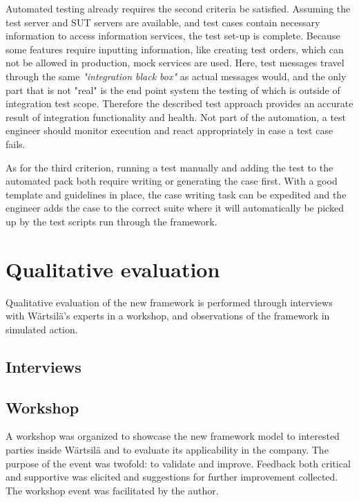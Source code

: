 \documentclass[12pt,a4paper,oneside,pdftex]{report}
\begin{document}
{{Automated testing already requires the second criteria be satisfied. Assuming the test server and SUT servers are available, and test cases contain necessary information to access information services, the test set-up is complete. Because some features require inputting information, like creating test orders, which can not be allowed in production, mock services are used. Here, test messages travel through the same \emph{"integration black box"} as actual messages would, and the only part that is not "real" is the end point system the testing of which is outside of integration test scope. Therefore the described test approach provides an accurate result of integration functionality and health. Not part of the automation, a test engineer should monitor execution and react appropriately in case a test case fails.

As for the third criterion, running a test manually and adding the test to the automated pack both require writing or generating the case first. With a good template and guidelines in place, the case writing task can be expedited and the engineer adds the case to the correct suite where it will automatically be picked up by the test scripts run through the framework.

\section{Qualitative evaluation}

Qualitative evaluation of the new framework is performed through interviews with Wärtsilä's experts in a workshop, and observations of the framework in simulated action.
\subsection{Interviews}

\subsection{Workshop}

A workshop was organized to showcase the new framework model to interested parties inside Wärtsilä and to evaluate its applicability in the company. The purpose of the event was twofold: to validate and improve. Feedback both critical and supportive was elicited and suggestions for further improvement collected. The workshop event was facilitated by the author.

}}
\end{document}
